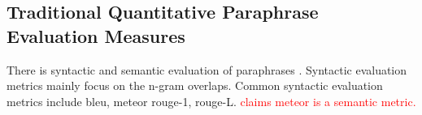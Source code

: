 \subsection{Traditional Quantitative Paraphrase Evaluation Measures}
\label{subsec:traditional_quantitative_evaluation_measures}



There is syntactic and semantic evaluation of paraphrases \citep{gohsen_captions_2023}.
Syntactic evaluation metrics mainly focus on the n-gram overlaps. %
Common syntactic evaluation metrics include \ac{bleu}, \ac{meteor} \ac{rouge}-1, \ac{rouge}-L.
\textcolor{red}{\citet{kurt_pehlivanoglu_comparative_2024} claims \ac{meteor} is a semantic metric.}



